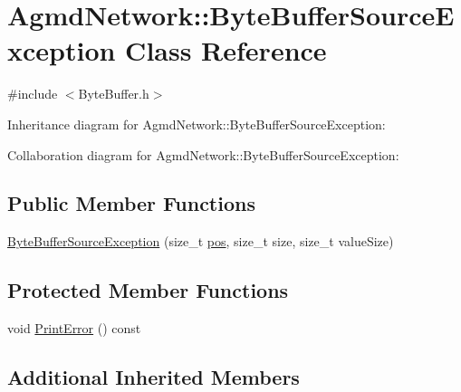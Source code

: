 \hypertarget{class_agmd_network_1_1_byte_buffer_source_exception}{\section{Agmd\+Network\+:\+:Byte\+Buffer\+Source\+Exception Class Reference}
\label{class_agmd_network_1_1_byte_buffer_source_exception}
}


{\ttfamily \#include $<$Byte\+Buffer.\+h$>$}



Inheritance diagram for Agmd\+Network\+:\+:Byte\+Buffer\+Source\+Exception\+:


Collaboration diagram for Agmd\+Network\+:\+:Byte\+Buffer\+Source\+Exception\+:
\subsection*{Public Member Functions}
\begin{DoxyCompactItemize}
\item 
\hyperlink{class_agmd_network_1_1_byte_buffer_source_exception_a9372cd9ff5a3e72ba4f786a74ff110e3}{Byte\+Buffer\+Source\+Exception} (size\+\_\+t \hyperlink{_examples_2_planet_2_app_8cpp_aa8a1c0491559faca4ebd0881575ae7f0}{pos}, size\+\_\+t size, size\+\_\+t value\+Size)
\end{DoxyCompactItemize}
\subsection*{Protected Member Functions}
\begin{DoxyCompactItemize}
\item 
void \hyperlink{class_agmd_network_1_1_byte_buffer_source_exception_a5f57d0b371a46dce083750bd0656d16f}{Print\+Error} () const 
\end{DoxyCompactItemize}
\subsection*{Additional Inherited Members}


